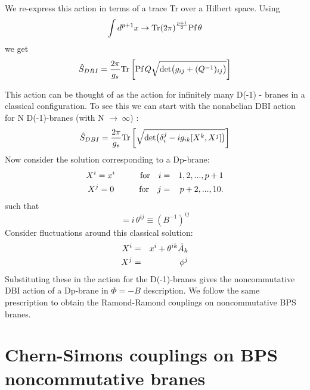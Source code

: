 \documentclass[a4paper,a4paper]{amsproc}
\theoremstyle{definition}
\theoremstyle{remark}
\numberwithin{equation}{section}
\begin{document}
We re-express this action in terms of a trace Tr over a Hilbert space.
Using
%
\begin{equation}
\int d^{p+1}x \rightarrow \hbox{Tr} (2\pi)^{\frac{p+1}{2}} \hbox{Pf}\,\theta
\end{equation}
%
we get
%
\begin{eqnarray}
\hat{S}_{DBI} = \frac{2\pi}{g_s} 
\hbox{Tr}\left[ \hbox{Pf}\, Q \sqrt{\hbox{det}\big(g_{ij} +
(Q^{-1})_{ij}\big)}\right]
\end{eqnarray}
%

This action can be thought of as the action for infinitely many D(-1)
- branes in a classical configuration. To see this we can start
with the nonabelian DBI action for N D(-1)-branes (with N $\rightarrow
~\infty$) \cite{myers}:
%
\begin{equation}
\hat{S}_{DBI} = \frac{2\pi}{g_s} 
\hbox{Tr}\left[ \sqrt{\hbox{det}\big(\delta_i^j - i g_{ik}[X^k,
X^j]\big)} \right]
\end{equation}
%
Now consider the solution corresponding to a Dp-brane:
%
\begin{eqnarray}
X^i = x^i \qquad\quad \hbox{for} \quad i &=& 1, 2,..., p+1 \cr
X^j = 0   \qquad\quad \hbox{for} \quad j &=& p+2,..., 10.\cr
\end{eqnarray}
%
such that
%
\begin{equation}
[x^i, x^j] = 
i\,\theta^{ij} \equiv (B^{-1})^{ij}
\end{equation}
%
Consider fluctuations around this classical solution:
%
\begin{eqnarray}
X^i &=& x^i + \theta^{ik}\hat A_k \cr
X^j &=& \phi^j 
\end{eqnarray}
%
Substituting these in the action for the D(-1)-branes gives
the noncommutative DBI action of a Dp-brane in $\Phi = -B$
description. We follow the same prescription to obtain the
Ramond-Ramond couplings on noncommutative BPS branes.

\section{Chern-Simons couplings on BPS noncommutative branes}
\end{document}

